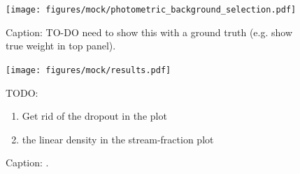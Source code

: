 \documentclass[twocolumn]{aastex631}
\newcommand{\mbf}[1]{\mathbf{#1}}
\newcommand{\mcal}[1]{\mathcal{#1}}
\newcommand{\Exp}[1]{e^{#1}}
\newcommand{\pdf}{\mcal{P}}
\begin{document}




        




        \begin{figure}
            \centering
            \texttt{[image: figures/mock/photometric\_background\_selection.pdf]}
            \caption{Caption: TO-DO need to show this with a ground truth (e.g. show true weight in top panel).}
            \label{fig:mock_data_photometric_background_selection}
        \end{figure}

        \begin{figure}
            \centering
            \texttt{[image: figures/mock/results.pdf]}
            \caption{Caption: .}
            TODO:
            \begin{enumerate}
                \item Get rid of the dropout in the plot
                \item the linear density in the stream-fraction plot
            \end{enumerate}
            \label{fig:mock_data_result}
        \end{figure}
\end{document}
